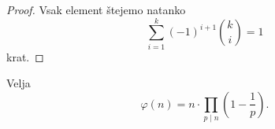 \begin{proof}
Vsak element štejemo natanko
\[
\sum_{i=1}^k (-1)^{i+1} \binom{k}{i} = 1
\]
krat.
\end{proof}

\begin{izrek}
Velja
\[
\varphi(n) = n \cdot \prod_{p \mid n} \left(1 - \frac{1}{p}\right).
\]
\end{izrek}

\obvs

